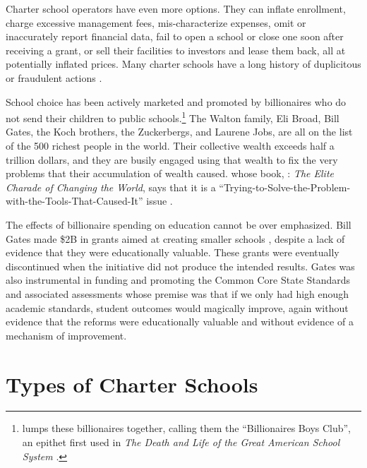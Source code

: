 Charter school operators have even more options. They can inflate enrollment, charge excessive management fees, mis-characterize expenses, omit or inaccurately report financial data, fail to open a school or close one soon after receiving a grant, or sell their facilities to investors and lease them back, all at potentially inflated prices. Many charter schools have a long history of duplicitous or fraudulent actions \parencite{Baker.Miron2015,ITPI2018, Burris.Bryant2020, Lafer.etal2021}.

School choice has been actively marketed and promoted by billionaires who do not send their children to public schools.\footnote{\citeauthor{Ravitch2016} lumps these billionaires together, calling them the ``Billionaires  Boys Club'', an epithet first used in \textit{The Death and Life of the Great American School System} \parencite{Ravitch2016}.} The Walton family, Eli Broad, Bill Gates, the Koch brothers, the Zuckerbergs, and Laurene Jobs, are all on the list of the 500 richest people in the world. Their collective wealth exceeds half a trillion dollars, and they are busily engaged using that wealth to fix the very problems that their accumulation of wealth caused. \textcite{Giridharadas2018} whose book, : \textit{The Elite Charade of Changing the World}, says that it is a ``Trying-to-Solve-the-Problem-with-the-Tools-That-Caused-It'' issue \parencite[142]{Giridharadas2018}.

The effects of billionaire spending on education cannot be over emphasized. Bill Gates made \$2B in grants aimed at creating smaller schools \parencite[11]{Gates2009}, despite a lack of evidence that they were educationally valuable. These grants were eventually discontinued when the initiative did not produce the intended results. Gates was also instrumental in funding and promoting the Common Core State Standards and associated assessments whose premise was that if we only had high enough academic standards, student outcomes would magically improve, again without evidence that the reforms were educationally valuable and without evidence of a mechanism of improvement.

\section{Types of Charter Schools}\label{sec:types-charters}\indent

